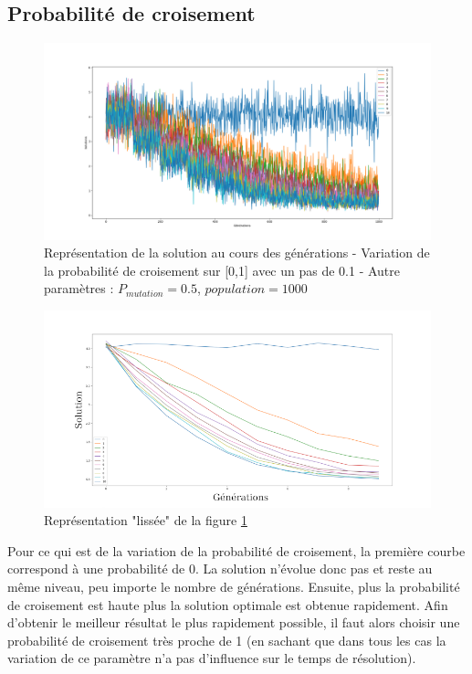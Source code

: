 \documentclass[12pt]{report}
\begin{document}
      \subsection{Probabilité de croisement}

      \begin{figure}[h]
        \centering
        \includegraphics[width=15cm]{img/evo_crossover_brut.png}
        \caption{Représentation de la solution au cours des générations - Variation de la probabilité de croisement sur [0,1] avec un pas de 0.1 - Autre paramètres : $P_{mutation} = 0.5$, $population = 1000$}
        \label{evo_crossover_brut}
      \end{figure}

      \begin{figure}[!]
        \centering
        \includegraphics[width=15cm]{img/evo_crossover_moy.png}
        \caption{Représentation "lissée" de la figure \ref{evo_crossover_brut}}
        \label{evo_crossover_moy}
      \end{figure}

      Pour ce qui est de la variation de la probabilité de croisement, la première courbe correspond à une probabilité de 0. La solution n'évolue donc pas et reste au même niveau, peu importe le nombre de générations. Ensuite, plus la probabilité de croisement est haute plus la solution optimale est obtenue rapidement. Afin d'obtenir le meilleur résultat le plus rapidement possible, il faut alors choisir une probabilité de croisement très proche de 1 (en sachant que dans tous les cas la variation de ce paramètre n'a pas d'influence sur le temps de résolution).
\end{document}
